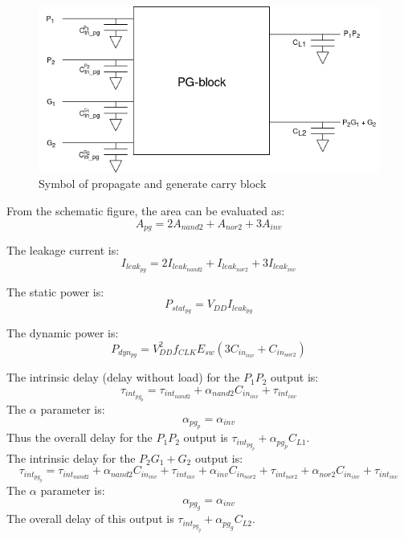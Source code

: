 \begin{figure}[H]
\centering
\includegraphics[width = 8 cm]{pentium/propagate_generate_block_black_box.png}
\caption{Symbol of propagate and generate carry block}
\label{fig:pg_bb}
\end{figure}

From the schematic figure, the area can be evaluated as:
\begin{equation}
A_{pg} = 2 A_{nand2} + A_{nor2} + 3 A_{inv}
\end{equation}

The leakage current is:
\begin{equation}
I_{leak_{pg}} = 2 I_{leak_{nand2}} + I_{leak_{nor2}} + 3 I_{leak_{inv}}
\end{equation}

The static power is:
\begin{equation}
P_{stat_{pg}} = V_{DD} I_{leak_{pg}}
\end{equation}

The dynamic power is:
\begin{equation}
P_{dyn_{pg}} = V_{DD}^2 f_{CLK} E_{sw} (3 C_{in_{inv}}  +  C_{in_{nor2}})
\end{equation}

The intrinsic delay (delay without load) for the $P_1 P_2$ output is:
\begin{equation}
\tau_{int_{pg_p}} = \tau_{int_{nand2}} + \alpha_{nand2} C_{in_{inv}} + \tau_{int_{inv}}
\end{equation}
The $\alpha$ parameter is:
\begin{equation}
\alpha_{pg_p} = \alpha_{inv}
\end{equation}
Thus the overall delay for the $P_1 P_2$ output  is $\tau_{int_{pg_p}} + \alpha_{pg_p} C_{L1}$.\\


The intrinsic delay for the $P_2G_1+G_2$  output is:
\begin{equation}
\tau_{int_{pg_g}} = \tau_{int_{nand2}} + \alpha_{nand2} C_{in_{inv}} + \tau_{int_{inv}} + \alpha_{inv} C_{in_{nor2}} + \tau_{int_{nor2}} + \alpha_{nor2} C_{in_{inv}} + \tau_{int_{inv}}
\end{equation}
The $\alpha$ parameter is:
\begin{equation}
\alpha_{pg_g} = \alpha_{inv}
\end{equation}
The overall delay of this output is $ \tau_{int_{pg_g}} + \alpha_{pg_g} C_{L2}$.\\

